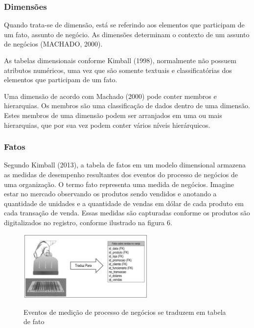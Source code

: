 \subsubsection{Dimensões}

Quando trata-se de dimensão, está se referindo aos elementos que participam de um fato, assunto de negócio. As dimensões determinam o contexto de um assunto de negócios (MACHADO, 2000).

As tabelas dimensionais conforme Kimball (1998), normalmente não possuem atributos numéricos, uma vez que são somente textuais e classificatórias dos elementos que participam de um fato.

Uma dimensão de acordo com Machado (2000) pode conter membros e hierarquias. Os membros são uma classificação de dados dentro de uma dimensão. Estes membros de uma dimensão podem ser arranjados em uma ou mais hierarquias, que por sua vez podem conter vários níveis hierárquicos.

\subsubsection{Fatos}

Segundo Kimball (2013), a tabela de fatos em um modelo dimensional armazena as medidas de desempenho resultantes dos eventos do processo de negócios de uma organiza\c{c}\~{a}o.
O termo fato representa uma medida de negócios. Imagine estar no mercado observando os produtos sendo vendidos e anotando a quantidade de unidades e a quantidade de vendas em dólar de cada produto em cada transa\c{c}\~{a}o de venda. Essas medidas s\~{a}o capturadas conforme os produtos s\~{a}o digitalizados no registro, conforme ilustrado na figura 6.

\begin{figure}[H]
	\vspace*{0,2cm}
    \centering
    \caption{Eventos de medi\c{c}\~{a}o de processo de negócios se traduzem em tabela de fato}
    \includegraphics[width=0.6\textwidth]{./04-figuras/figura-06}
    \label{fig:ilustfig06}
\end{figure}
\vspace*{-0,9cm}
{\raggedright {}}\\


